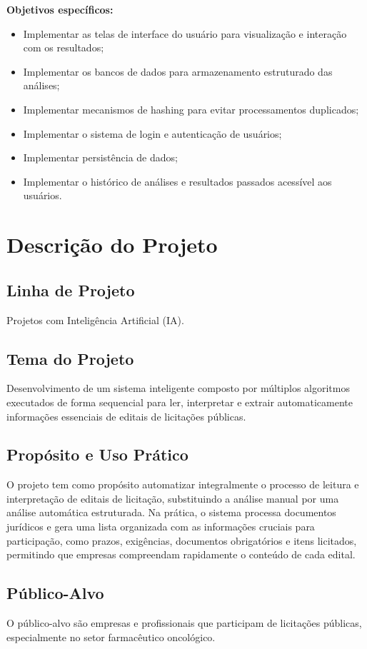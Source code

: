 \documentclass[a4paper,12pt]{article}
\begin{document}
\textbf{Objetivos específicos:}
\begin{itemize}
  \item Implementar as telas de interface do usuário para visualização e
interação com os resultados;
  \item Implementar os bancos de dados para armazenamento estruturado
das análises;
  \item Implementar mecanismos de hashing para evitar processamentos
duplicados;
  \item Implementar o sistema de login e autenticação de usuários;
  \item Implementar persistência de dados;
  \item Implementar o histórico de análises e resultados passados acessível
aos usuários.

\end{itemize}

\section{Descrição do Projeto}

\subsection{Linha de Projeto}
Projetos com Inteligência Artificial (IA).

\subsection{Tema do Projeto}
Desenvolvimento de um sistema inteligente composto por múltiplos
algoritmos executados de forma sequencial para ler, interpretar e extrair
automaticamente informações essenciais de editais de licitações públicas.

\subsection{Propósito e Uso Prático}
O projeto tem como propósito automatizar integralmente o processo de
leitura e interpretação de editais de licitação, substituindo a análise manual por
uma análise automática estruturada.
Na prática, o sistema processa documentos jurídicos e gera uma lista
organizada com as informações cruciais para participação, como prazos,
exigências, documentos obrigatórios e itens licitados, permitindo que empresas
compreendam rapidamente o conteúdo de cada edital.

\subsection{Público-Alvo}
O público-alvo são empresas e profissionais que participam de licitações
públicas, especialmente no setor farmacêutico oncológico.
\end{document}
